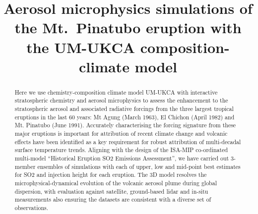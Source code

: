\documentclass[journal abbreviation, manuscript]{copernicus}
\begin{document}
\title{Aerosol microphysics simulations of the Mt.~Pinatubo eruption with the UM-UKCA composition-climate model}










\maketitle



\begin{abstract}
Here we use chemistry-composition climate model UM-UKCA with interactive stratospheric chemistry and aerosol microphysics to assess the enhancement to the stratospheric aerosol and associated radiative forcings from the three largest tropical eruptions in the last 60 years: Mt Agung (March 1963), El Chichon (April 1982) and Mt. Pinatubo (June 1991). Accurately characterising the forcing signature from these major eruptions is important for attribution of recent climate change and volcanic effects have been identified as a key requirement for robust attribution of multi-decadal surface temperature trends.
Aligning with the design of the ISA-MIP co-ordinated multi-model “Historical Eruption SO2 Emissions Assessment”, we have carried out 3-member ensembles of simulations with each of upper, low and mid-point best estimates for SO2 and injection height for each eruption. The 3D model resolves the microphysical-dynamical evolution of the volcanic aerosol plume during global dispersion, with evaluation against satellite, ground-based lidar and in-situ measurements also ensuring the datasets are consistent with a diverse set of observations.
\end{abstract}
\end{document}
